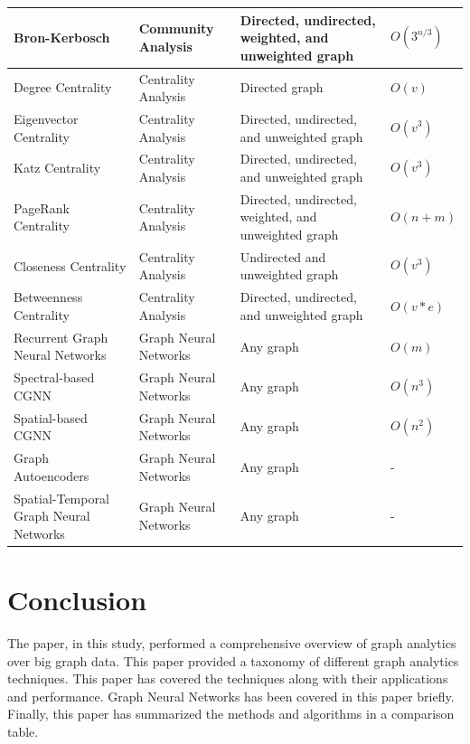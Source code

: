 \documentclass[journal,twoside,web]{ieeecolor}
\begin{document}
\begin{table}[]
\begin{tabular}{l l l l}
    Bron-Kerbosch & Community Analysis & Directed, undirected, weighted, and unweighted graph & $O(3^{n/3})$  \\ \midrule
    Degree Centrality & Centrality Analysis & Directed graph & $O(v)$  \\ \midrule
    Eigenvector Centrality & Centrality Analysis & Directed, undirected, and unweighted graph & $O(v^3)$  \\ \midrule
    Katz Centrality & Centrality Analysis & Directed, undirected, and unweighted graph & $O(v^3)$  \\ \midrule
    PageRank Centrality & Centrality Analysis & Directed, undirected, weighted, and unweighted graph & $O(n + m)$  \\ \midrule
    Closeness Centrality & Centrality Analysis & Undirected and unweighted graph & $O(v^3)$  \\ \midrule
    Betweenness Centrality & Centrality Analysis & Directed, undirected, and unweighted graph & $O(v * e)$  \\ \midrule
    Recurrent Graph Neural Networks & Graph Neural Networks & Any graph & $O(m)$  \\ \midrule
    Spectral-based CGNN & Graph Neural Networks & Any graph & $O(n^3)$  \\ \midrule
    Spatial-based CGNN & Graph Neural Networks & Any graph & $O(n^2)$  \\ \midrule
    Graph Autoencoders & Graph Neural Networks & Any graph & -  \\ \midrule
    Spatial-Temporal Graph Neural Networks & Graph Neural Networks & Any graph & -  \\
    \bottomrule
    \end{tabular}
\end{table}

\section{Conclusion}
\label{sec:conclusion}
The paper, in this study, performed a comprehensive overview of graph analytics over big graph data. This paper provided a taxonomy of different graph analytics techniques. This paper has covered the techniques along with their applications and performance. Graph Neural Networks has been covered in this paper briefly. Finally, this paper has summarized the methods and algorithms in a comparison table.
\end{document}
